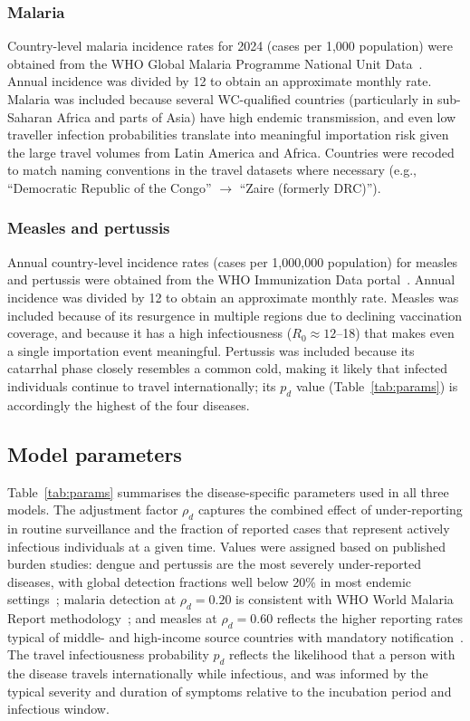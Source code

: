 \documentclass[12pt]{article}
\begin{document}
\subsubsection*{Malaria}

Country-level malaria incidence rates for 2024 (cases per 1,000
population) were obtained from the WHO Global Malaria Programme
National Unit Data~\cite{whoWMR2024}. Annual incidence was divided by 12 to obtain an
approximate monthly rate. Malaria was included because several
WC-qualified countries (particularly in sub-Saharan Africa and parts
of Asia) have high endemic transmission, and even low traveller
infection probabilities translate into meaningful importation risk
given the large travel volumes from Latin America and Africa.
Countries were recoded to match naming conventions in the travel
datasets where necessary (e.g.,
``Democratic Republic of the Congo'' $\to$ ``Zaire (formerly DRC)'').

\subsubsection*{Measles and pertussis}

Annual country-level incidence rates (cases per 1,000,000 population)
for measles and pertussis were obtained from the WHO Immunization Data
portal~\cite{WHO_immunization}. Annual
incidence was divided by 12 to obtain an approximate monthly rate.
Measles was included because of its resurgence in multiple regions due
to declining vaccination coverage, and because it has a high
infectiousness ($R_0 \approx 12$--18) that makes even a single
importation event meaningful. Pertussis was included because its
catarrhal phase closely resembles a common cold, making it likely that
infected individuals continue to travel internationally; its $p_d$
value (Table~\ref{tab:params}) is accordingly the highest of the four
diseases.

\subsection*{Model parameters}

Table~\ref{tab:params} summarises the disease-specific parameters
used in all three models. The adjustment factor $\rho_d$ captures the
combined effect of under-reporting in routine surveillance and the
fraction of reported cases that represent actively infectious
individuals at a given time. Values were assigned based on published
burden studies: dengue and pertussis are the most severely
under-reported diseases, with global detection fractions well below
20\% in most endemic settings~\cite{bhatt2013,undurraga2013,mclaughlin2016};
malaria detection at $\rho_d = 0.20$ is consistent with WHO World
Malaria Report methodology~\cite{whoWMR2024}; and measles at
$\rho_d = 0.60$ reflects the higher reporting rates typical of
middle- and high-income source countries with mandatory
notification~\cite{simons2012}.
The travel infectiousness probability $p_d$ reflects the likelihood
that a person with the disease travels internationally while
infectious, and was informed by the typical severity and duration of
symptoms relative to the incubation period and infectious window.
\end{document}

